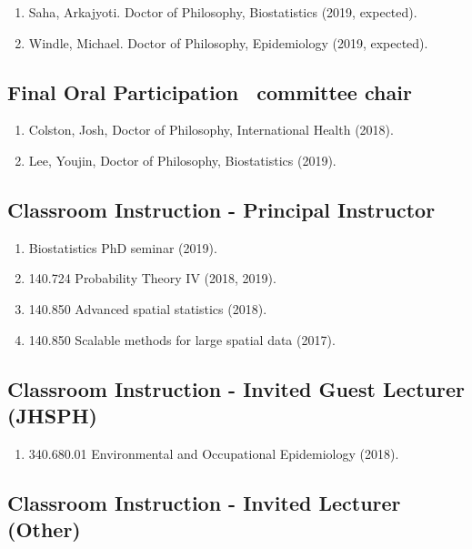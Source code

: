 \documentclass[10pt]{article}
\newcommand{\dn}[1]{{\color{black} {#1}}}
\newcommand{\myben}[1]{\smallskip\begin{enumerate}[start=1,label={\scriptsize \arabic*$\ $},leftmargin=\parindent]\setlength{\itemsep}{#1}\vspace*{-0.7em}}
\newcommand{\mydot}[1]{\begin{enumerate}[label=$\circ$,leftmargin=\parindent]\setlength{\itemsep}{#1}}
\newcommand{\ee}{\end{enumerate}}
\newcommand{\mylift}[1]{\vspace*{#1}}
\begin{document}
\myben{-0.1em}

\item \dn{Saha}, Arkajyoti. Doctor of Philosophy, Biostatistics (2019, expected).
\item \dn{Windle}, Michael. Doctor of Philosophy, Epidemiology (2019, expected).

\ee

\mylift{-1.0em}

\subsection*{Final Oral Participation \ \tiny * committee chair}

\myben{-0.1em}

\item \dn{Colston}, Josh, Doctor of Philosophy, International Health (2018).
\item \dn{Lee}, Youjin, Doctor of Philosophy, Biostatistics (2019).
\ee

\mylift{-0.5em}

\subsection*{Classroom Instruction - Principal Instructor}

\mydot{-0.1em}

\item Biostatistics PhD seminar (2019).
\item 140.724 Probability Theory IV (2018, 2019).
\item 140.850 Advanced spatial statistics (2018).
\item 140.850 Scalable methods for large spatial data (2017).

\ee

\mylift{-1.5em}

\subsection*{Classroom Instruction - Invited Guest Lecturer (JHSPH)}

\mydot{-0.1em}

\item 340.680.01 Environmental and Occupational Epidemiology (2018).

\ee

\mylift{-1.5em}

\subsection*{Classroom Instruction - Invited Lecturer (Other)}
\end{document}
